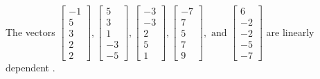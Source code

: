 \begin{exercise}
\begin{exerciseStatement}
  \end{exerciseStatement}
  \begin{exerciseAnswer}
   The vectors \(\left[\begin{array}{r}
-1 \\
5 \\
3 \\
2 \\
2
\end{array}\right] , \left[\begin{array}{r}
5 \\
3 \\
1 \\
-3 \\
-5
\end{array}\right] , \left[\begin{array}{r}
-3 \\
-3 \\
2 \\
5 \\
1
\end{array}\right] , \left[\begin{array}{r}
-7 \\
7 \\
5 \\
7 \\
9
\end{array}\right] , \text{ and } \left[\begin{array}{r}
6 \\
-2 \\
-2 \\
-5 \\
-7
\end{array}\right]\) are 
  	 linearly dependent  .
  


  \end{exerciseAnswer}
\end{exercise}